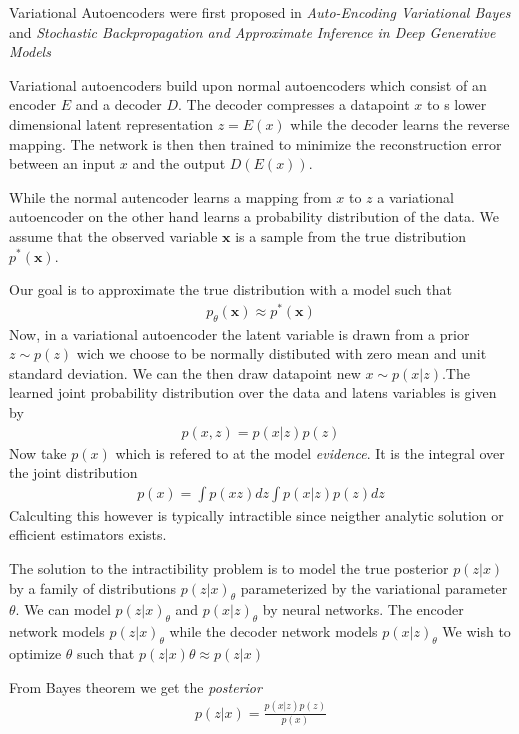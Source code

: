 Variational Autoencoders were first proposed in \textit{Auto-Encoding Variational Bayes} \cite{vae1} and \textit{Stochastic Backpropagation and Approximate Inference in Deep Generative Models} \cite{vae2}

Variational autoencoders build upon normal autoencoders which consist of an encoder $E$ and a decoder $D$. The decoder compresses a datapoint $x$ to s lower dimensional latent representation $z = E(x)$ while the decoder learns the reverse mapping. The network is then then trained to minimize the reconstruction error between an input $x$ and the output $D(E(x))$. 

While the normal autencoder learns a mapping from $x$ to $z$ a variational autoencoder on the other hand learns a probability distribution of the data. 
We assume that the observed variable $\mathbf{x}$ is a sample from the true distribution $p^*(\mathbf{x})$.\cite{vaeintro} 

Our goal is to approximate the true distribution with a model such that
\begin{align}
  p_\theta(\mathbf{x})\approx p^*(\mathbf{x})
\end{align}
Now, in a variational autoencoder the latent variable is drawn from a prior $z\sim p(z)$ wich we choose to be normally distibuted with zero mean and unit standard deviation. We can the then draw datapoint new $x\sim p(x|z)$.The learned joint probability distribution over the data and latens variables is given by
\begin{align}
    p(x,z)=p(x|z)p(z)
\end{align}
Now take $p(x)$ which is refered to at the model \emph{evidence}. It is the integral over the joint distribution
\begin{align}
    p(x)= \int p(xz)dz \int p(x|z) p(z)dz 
    \label{evidence}
\end{align}
Calculting this however is typically intractible since neigther analytic solution or efficient estimators exists. \cite{vaeintro} 

The solution to the intractibility problem is to model the true posterior $p(z|x)$ by a family of distributions $p(z|x)_\theta$ parameterized by the variational parameter $\theta$. We can model $p(z|x)_\theta$ and $p(x|z)_\theta$ by neural networks. The encoder network models $p(z|x)_\theta$ while the decoder network models $p(x|z)_\theta$ We wish to optimize $\theta$ such that $p(z|x)\theta \approx p(z|x)$

From Bayes theorem we get the \emph{posterior}  
\begin{align}
    p(z|x) =\frac{p(x|z)p(z)}{p(x)}
\end{align}

